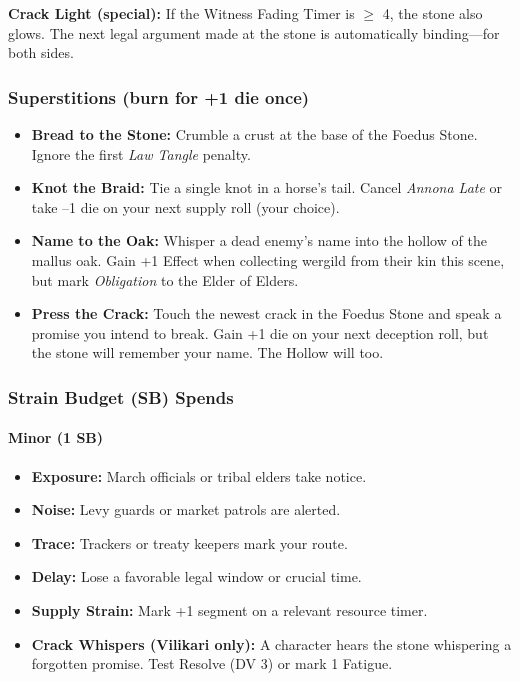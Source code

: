 \noindent\textbf{Crack Light (special):} If the Witness Fading Timer is $\geq$ 4, the stone also glows. The next legal argument made at the stone is automatically binding---for both sides.

\subsubsection{Superstitions (burn for +1 die once)}

\begin{itemize}[nosep]
  \item \textbf{Bread to the Stone:} Crumble a crust at the base of the Foedus Stone. Ignore the first \emph{Law Tangle} penalty.
  \item \textbf{Knot the Braid:} Tie a single knot in a horse's tail. Cancel \emph{Annona Late} or take --1 die on your next supply roll (your choice).
  \item \textbf{Name to the Oak:} Whisper a dead enemy's name into the hollow of the mallus oak. Gain +1 Effect when collecting wergild from their kin this scene, but mark \emph{Obligation} to the Elder of Elders.
  \item \textbf{Press the Crack:} Touch the newest crack in the Foedus Stone and speak a promise you intend to break. Gain +1 die on your next deception roll, but the stone will remember your name. The Hollow will too.
\end{itemize}

\subsubsection{Strain Budget (SB) Spends}

\paragraph{Minor (1 SB)}
\begin{itemize}[nosep]
  \item \textbf{Exposure:} March officials or tribal elders take notice.
  \item \textbf{Noise:} Levy guards or market patrols are alerted.
  \item \textbf{Trace:} Trackers or treaty keepers mark your route.
  \item \textbf{Delay:} Lose a favorable legal window or crucial time.
  \item \textbf{Supply Strain:} Mark +1 segment on a relevant resource timer.
  \item \textbf{Crack Whispers (Vilikari only):} A character hears the stone whispering a forgotten promise. Test Resolve (DV 3) or mark 1 Fatigue.
\end{itemize}

